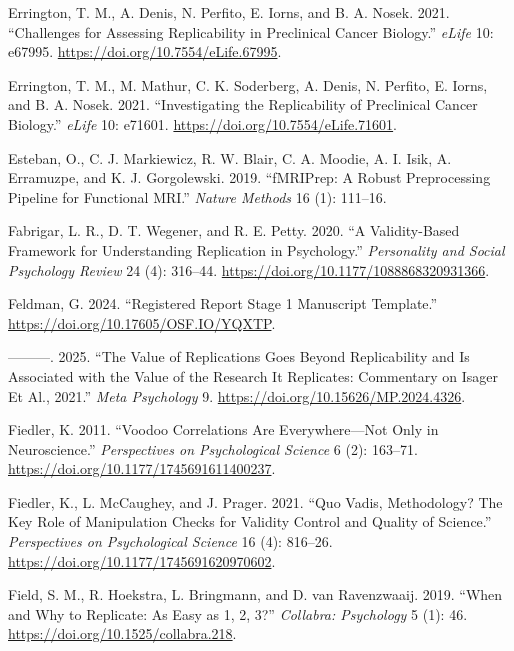 \documentclass[
  letterpaper,
  DIV=11,
  openany,
  fontsize=12pt,
  parskip=half,
  headings=big,
  numbers=noenddot,
  titlepage=false]{scrreprt}
\newlength{\cslhangindent}
\newenvironment{CSLReferences}[2] %
 {\begin{list}{}{%
  \setlength{\itemindent}{0pt}
  \setlength{\leftmargin}{0pt}
  \setlength{\parsep}{0pt}
  \ifodd #1
   \setlength{\leftmargin}{\cslhangindent}
   \setlength{\itemindent}{-1\cslhangindent}
  \fi
  \setlength{\itemsep}{#2\baselineskip}}}
 {\end{list}}
\begin{document}
\begin{CSLReferences}{1}{0}
Errington, T. M., A. Denis, N. Perfito, E. Iorns, and B. A. Nosek. 2021.
{``Challenges for Assessing Replicability in Preclinical Cancer
Biology.''} \emph{eLife} 10: e67995.
\url{https://doi.org/10.7554/eLife.67995}.

Errington, T. M., M. Mathur, C. K. Soderberg, A. Denis, N. Perfito, E.
Iorns, and B. A. Nosek. 2021. {``Investigating the Replicability of
Preclinical Cancer Biology.''} \emph{eLife} 10: e71601.
\url{https://doi.org/10.7554/eLife.71601}.

Esteban, O., C. J. Markiewicz, R. W. Blair, C. A. Moodie, A. I. Isik, A.
Erramuzpe, and K. J. Gorgolewski. 2019. {``fMRIPrep: A Robust
Preprocessing Pipeline for Functional MRI.''} \emph{Nature Methods} 16
(1): 111--16.

Fabrigar, L. R., D. T. Wegener, and R. E. Petty. 2020. {``A
Validity-Based Framework for Understanding Replication in Psychology.''}
\emph{Personality and Social Psychology Review} 24 (4): 316--44.
\url{https://doi.org/10.1177/1088868320931366}.

Feldman, G. 2024. {``Registered Report Stage 1 Manuscript Template.''}
\url{https://doi.org/10.17605/OSF.IO/YQXTP}.

---------. 2025. {``The Value of Replications Goes Beyond Replicability
and Is Associated with the Value of the Research It Replicates:
Commentary on Isager Et Al., 2021.''} \emph{Meta Psychology} 9.
\url{https://doi.org/10.15626/MP.2024.4326}.

Fiedler, K. 2011. {``Voodoo Correlations Are Everywhere---Not Only in
Neuroscience.''} \emph{Perspectives on Psychological Science} 6 (2):
163--71. \url{https://doi.org/10.1177/1745691611400237}.

Fiedler, K., L. McCaughey, and J. Prager. 2021. {``Quo Vadis,
Methodology? The Key Role of Manipulation Checks for Validity Control
and Quality of Science.''} \emph{Perspectives on Psychological Science}
16 (4): 816--26. \url{https://doi.org/10.1177/1745691620970602}.

Field, S. M., R. Hoekstra, L. Bringmann, and D. van Ravenzwaaij. 2019.
{``When and Why to Replicate: As Easy as 1, 2, 3?''} \emph{Collabra:
Psychology} 5 (1): 46. \url{https://doi.org/10.1525/collabra.218}.


\end{CSLReferences}
\end{document}
